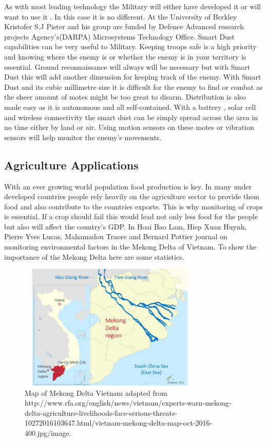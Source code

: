 \documentclass[article]{IEEEtran}
\begin{document}
As with most leading technology the Military will either have developed it or will want to use it . In this case it is no different. At the University of Berkley Kristofer S.J Pister and his group are funded by Defence Advanced research projects Agency’s(DARPA) Microsystems Technology Office\cite{Mili}. Smart Dust capabilities can be very useful to Military. Keeping troops safe is a high priority and knowing where the enemy is or whether the enemy is in your territory is essential.
Ground reconnaissance will always will be necessary but with Smart Dust this will add another dimension for keeping track of the enemy.  With Smart Dust and its cubic millimetre size it is difficult for the enemy to find or combat as the sheer amount of motes might be too great to disarm. Distribution is also made easy as it is autonomous and all self-contained. With a battery , solar cell and wireless connectivity the smart dust can be simply spread across the area in no time either by land or air\cite{Lightweight}. Using motion sensors on these motes or vibration sensors will help monitor the enemy’s movements\cite{friendorfoe}.

\subsection{Agriculture Applications}

With an ever growing world population food production is key. In many under developed countries people rely heavily on the agriculture sector to provide them food and also contribute to the countries exports. This is why monitoring of crops is essential. If a crop should fail this would lead not only less food for the people but also will affect the country’s GDP. In Hoai Bao Lam, Hiep Xuan Huynh, Pierre Yves Lucas, Mahamadou Traore and Bernard Pottier journal on monitoring environmental factors in the Mekong Delta of Vietnam. To show the importance of the Mekong Delta here are some statistics\cite{MekongDelta}.

\begin{figure}[h!]
\graphicspath{ {images/} }
\includegraphics[width=8.8cm, height=6cm]{mekongdelta}
\caption{Map of Mekong Delta Vietnam adapted from http://www.rfa.org/english/news/vietnam/experts-warn-mekong-delta-agriculture-livelihoods-face-serious-threats-10272016103647.html/vietnam-mekong-delta-map-oct-2016-400.jpg/image.}
\label{Map of Mekong Delta}
\end{figure}
\end{document}

